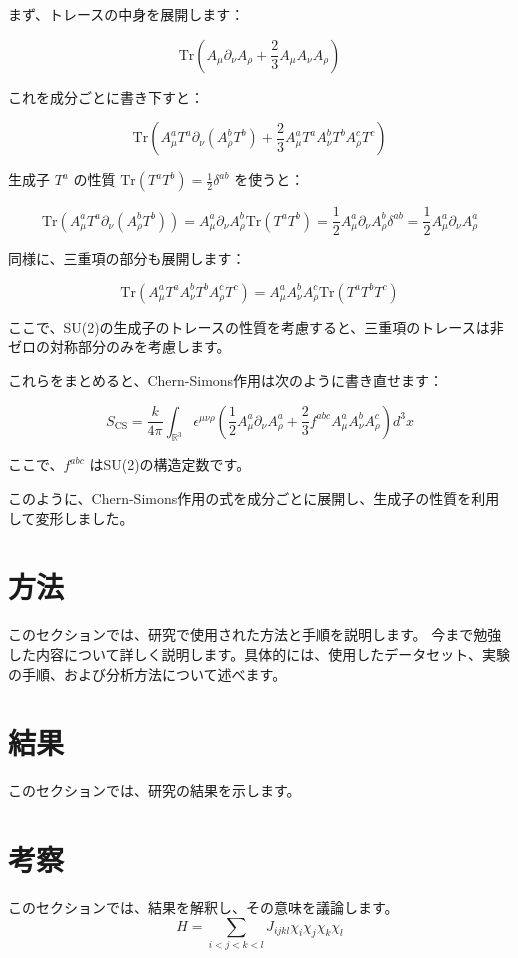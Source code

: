 \documentclass[a4paper,12pt]{article}
\begin{document}
まず、トレースの中身を展開します：

\[
\text{Tr} \left( A_\mu \partial_\nu A_\rho + \frac{2}{3} A_\mu A_\nu A_\rho \right)
\]

これを成分ごとに書き下すと：

\[
\text{Tr} \left( A_\mu^a T^a \partial_\nu (A_\rho^b T^b) + \frac{2}{3} A_\mu^a T^a A_\nu^b T^b A_\rho^c T^c \right)
\]

生成子 $ T^a $ の性質 $ \text{Tr}(T^a T^b) = \frac{1}{2}\delta^{ab} $ を使うと：

\[
\text{Tr} \left( A_\mu^a T^a \partial_\nu (A_\rho^b T^b) \right) = A_\mu^a \partial_\nu A_\rho^b \text{Tr}(T^a T^b) = \frac{1}{2} A_\mu^a \partial_\nu A_\rho^b \delta^{ab} = \frac{1}{2} A_\mu^a \partial_\nu A_\rho^a
\]

同様に、三重項の部分も展開します：

\[
\text{Tr} \left( A_\mu^a T^a A_\nu^b T^b A_\rho^c T^c \right) = A_\mu^a A_\nu^b A_\rho^c \text{Tr}(T^a T^b T^c)
\]

ここで、SU(2)の生成子のトレースの性質を考慮すると、三重項のトレースは非ゼロの対称部分のみを考慮します。

これらをまとめると、Chern-Simons作用は次のように書き直せます：

\[
S_{\mathrm{CS}} = \frac{k}{4\pi} \int_{\mathbb{R}^3} \epsilon^{\mu\nu\rho} \left( \frac{1}{2} A_\mu^a \partial_\nu A_\rho^a + \frac{2}{3} f^{abc} A_\mu^a A_\nu^b A_\rho^c \right) d^3x
\]

ここで、$ f^{abc} $ はSU(2)の構造定数です。

このように、Chern-Simons作用の式を成分ごとに展開し、生成子の性質を利用して変形しました。

\section{方法}
このセクションでは、研究で使用された方法と手順を説明します。
今まで勉強した内容について詳しく説明します。具体的には、使用したデータセット、実験の手順、および分析方法について述べます。
\section{結果}
このセクションでは、研究の結果を示します。
\section{考察}
このセクションでは、結果を解釈し、その意味を議論します。
\begin{equation}
H = \sum_{i < j < k < l} J_{ijkl} \chi_i \chi_j \chi_k \chi_l
\end{equation}
\end{document}
